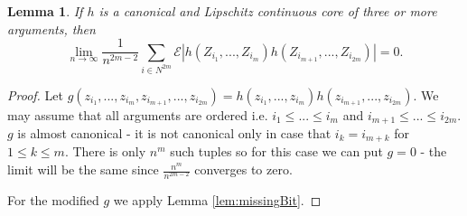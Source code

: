 \documentclass{article} %
\newtheorem{lemma}{Lemma}
\newcommand{\ev}{\mathcal{E}}
\begin{document}
\begin{lemma}
\label{lem:auxAsymp2}
If $h$ is a canonical and Lipschitz continuous core of three or more arguments, then
\[
  \lim_{n \to \infty}\frac{1} {n^{2m-2}}   \sum_{i \in N^{2m}} \ev |h(Z_{i_1},...,Z_{i_m})h(Z_{i_{m+1}},...,Z_{i_{2m}})| = 0.
\]
\end{lemma}
\begin{proof}
Let $g(z_{i_1},...,z_{i_m},z_{i_{m+1}},...,z_{i_{2m}})=h(z_{i_1},...,z_{i_m})h(z_{i_{m+1}},...,z_{i_{2m}})$. We may assume that all arguments are ordered i.e. $i_1 \leq ... \leq i_m$ and  $i_{m+1} \leq ... \leq i_{2m}$. $g$ is almost canonical - it is not canonical only in case that $i_k=i_{m+k}$ for $1 \leq k \leq m$. There is only $n^m$ such tuples so for this case we can put $g=0$ - the limit will be the same since $\frac{n^m}{n^{2m-2}}$ converges to zero.

For the modified $g$ we apply Lemma \ref{lem:missingBit}.
\end{proof}
\end{document}
